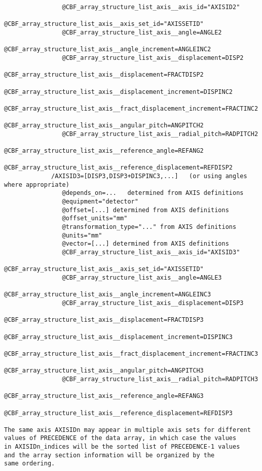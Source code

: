 \documentclass[11pt]{article}
\begin{document}
{\begin{verbatim}
                @CBF_array_structure_list_axis__axis_id="AXISID2"
                @CBF_array_structure_list_axis__axis_set_id="AXISSETID"
                @CBF_array_structure_list_axis__angle=ANGLE2
                @CBF_array_structure_list_axis__angle_increment=ANGLEINC2
                @CBF_array_structure_list_axis__displacement=DISP2
                @CBF_array_structure_list_axis__displacement=FRACTDISP2
                @CBF_array_structure_list_axis__displacement_increment=DISPINC2
                @CBF_array_structure_list_axis__fract_displacement_increment=FRACTINC2
                @CBF_array_structure_list_axis__angular_pitch=ANGPITCH2
                @CBF_array_structure_list_axis__radial_pitch=RADPITCH2
                @CBF_array_structure_list_axis__reference_angle=REFANG2
                @CBF_array_structure_list_axis__reference_displacement=REFDISP2
             /AXISID3=[DISP3,DISP3+DISPINC3,...]   (or using angles where appropriate)
                @depends_on=...   determined from AXIS definitions
                @equipment="detector"
                @offset=[...] determined from AXIS definitions
                @offset_units="mm"
                @transformation_type="..." from AXIS definitions
                @units="mm"
                @vector=[...] determined from AXIS definitions
                @CBF_array_structure_list_axis__axis_id="AXISID3"
                @CBF_array_structure_list_axis__axis_set_id="AXISSETID"
                @CBF_array_structure_list_axis__angle=ANGLE3
                @CBF_array_structure_list_axis__angle_increment=ANGLEINC3
                @CBF_array_structure_list_axis__displacement=DISP3
                @CBF_array_structure_list_axis__displacement=FRACTDISP3
                @CBF_array_structure_list_axis__displacement_increment=DISPINC3
                @CBF_array_structure_list_axis__fract_displacement_increment=FRACTINC3
                @CBF_array_structure_list_axis__angular_pitch=ANGPITCH3
                @CBF_array_structure_list_axis__radial_pitch=RADPITCH3
                @CBF_array_structure_list_axis__reference_angle=REFANG3
                @CBF_array_structure_list_axis__reference_displacement=REFDISP3

The same axis AXISIDn may appear in multiple axis sets for different
values of PRECEDENCE of the data array, in which case the values
in AXISIDn_indices will be the sorted list of PRECEDENCE-1 values
and the array section information will be organized by the
same ordering.
\end{verbatim}
}
\end{document}

